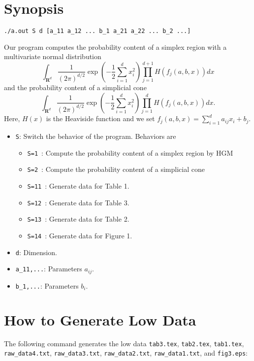 \documentclass[12pt]{article}
\begin{document}
\section{Synopsis}
\begin{verbatim}
./a.out S d [a_11 a_12 ... b_1 a_21 a_22 ... b_2 ...]
\end{verbatim}
Our program computes 
the probability content of a simplex region
with a multivariate normal distribution
$$
\int_{\mathbf R^d} \frac{1}{(2\pi)^{d/2}}
\exp\left(-\frac{1}{2}\sum_{i=1}^dx_i^2\right)
\prod_{j=1}^{d+1}H\left(f_j(a,b,x)\right)
dx
$$
and the probability content of a simplicial cone
$$
\int_{\mathbf R^d} \frac{1}{(2\pi)^{d/2}}
\exp\left(-\frac{1}{2}\sum_{i=1}^dx_i^2\right)
\prod_{j=1}^dH\left(f_j(a,b,x)\right)
dx.
$$
Here, $H(x)$ is the Heaviside function and we set 
$f_j(a,b,x)=\sum_{i=1}^da_{ij}x_i+b_j$.
\begin{itemize}
\item \verb+S+\/: Switch the behavior of the program. Behaviors are
  \begin{itemize}
    \item \verb+S=1+\ : %
    Compute the probability content of a simplex region by HGM
    \item \verb+S=2+\ : %
    Compute the probability content of a simplicial cone
    \item \verb+S=11+\ : %
    Generate data for Table 1.
    \item \verb+S=12+\ : %
    Generate data for Table 3.
    \item \verb+S=13+\ : %
    Generate data for Table 2.
    \item \verb+S=14+\ : %
    Generate data for Figure 1.
  \end{itemize}
\item \verb+d+\/: Dimension.
\item \verb+a_11,...+\/: Parameters $a_{ij}$.
\item \verb+b_1,...+\/: Parameters $b_i$.
\end{itemize}


\section{How to Generate Low Data}
The following command generates the low data
{\tt tab3.tex}, 
{\tt tab2.tex}, 
{\tt tab1.tex}, 
{\tt raw\_data4.txt}, 
{\tt raw\_data3.txt}, 
{\tt raw\_data2.txt},
{\tt raw\_data1.txt}, and
{\tt fig3.eps}:
\end{document}
